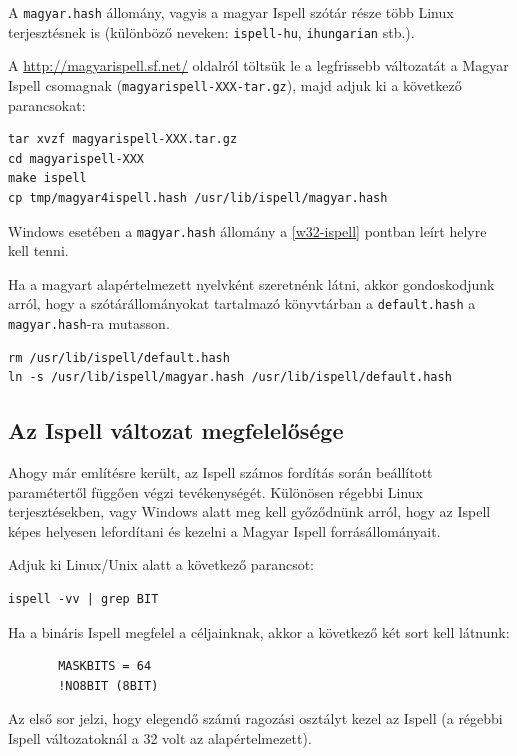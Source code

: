 A \texttt{magyar.hash} állomány, vagyis a magyar Ispell szótár része több Linux
terjesztésnek is (különböző neveken: \texttt{ispell-hu}, \texttt{ihungarian} stb.).

A \url{http://magyarispell.sf.net/} oldalról töltsük
le a legfrissebb változatát a Magyar Ispell csomagnak
(\texttt{magyarispell-XXX-tar.gz}), majd adjuk ki a
következő parancsokat:

\begin{verbatim}
tar xvzf magyarispell-XXX.tar.gz
cd magyarispell-XXX
make ispell
cp tmp/magyar4ispell.hash /usr/lib/ispell/magyar.hash
\end{verbatim}

Windows esetében a \texttt{magyar.hash} állomány a
\ref{w32-ispell} pontban leírt helyre kell tenni.

Ha a magyart alapértelmezett nyelvként szeretnénk látni,
akkor gondoskodjunk arról, hogy a szótárállományokat
tartalmazó könyvtárban a \texttt{default.hash}
a \texttt{magyar.hash}-ra mutasson.

\begin{verbatim}
rm /usr/lib/ispell/default.hash
ln -s /usr/lib/ispell/magyar.hash /usr/lib/ispell/default.hash
\end{verbatim}

\subsection{Az Ispell változat megfelelősége}

Ahogy már említésre került, az Ispell számos fordítás során
beállított paramétertől függően végzi tevékenységét.
Különösen régebbi Linux terjesztésekben, vagy Windows alatt
meg kell győződnünk arról, hogy az Ispell képes
helyesen lefordítani és kezelni
a Magyar Ispell forrásállományait.

Adjuk ki Linux/Unix alatt a következő parancsot:

\begin{verbatim}
ispell -vv | grep BIT
\end{verbatim}

Ha a bináris Ispell megfelel a céljainknak, akkor a következő
két sort kell látnunk:

\begin{verbatim}
       MASKBITS = 64
       !NO8BIT (8BIT)
\end{verbatim}

Az első sor jelzi, hogy elegendő számú ragozási osztályt kezel az Ispell
(a régebbi Ispell változatoknál a 32 volt az alapértelmezett).

